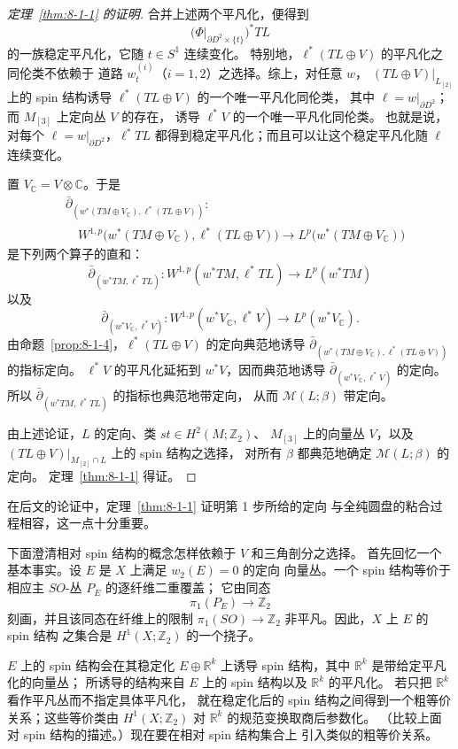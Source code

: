 \begin{proof}[定理~\ref{thm:8-1-1} 的证明]
合并上述两个平凡化，便得到
\[
\bigl(\Phi|_{\partial D^2\times\{t\}}\bigr)^*TL
\]
的一族稳定平凡化，它随 $t\in S^1$ 连续变化。
特别地，$\ell^*(TL\oplus V)$ 的平凡化之同伦类不依赖于
道路 $w_t^{(i)}$（$i=1,2$）之选择。综上，对任意 $w$，
$(TL\oplus V)|_{L_{[2]}}$ 上的 spin 结构诱导
$\ell^*(TL\oplus V)$ 的一个唯一平凡化同伦类，
其中 $\ell=w|_{\partial D^2}$；而 $M_{[3]}$ 上定向丛 $V$ 的存在，
诱导 $\ell^*V$ 的一个唯一平凡化同伦类。
也就是说，对每个 $\ell=w|_{\partial D^2}$，$\ell^*TL$
都得到稳定平凡化；而且可以让这个稳定平凡化随 $\ell$ 连续变化。

置 $V_{\mathbb C}=V\otimes\mathbb C$。于是
\[
\begin{aligned}
&\bar\partial_{(w^*(TM\oplus V_{\mathbb C}),
 \ell^*(TL\oplus V))}\colon\\[-0.2em]
&\quad
W^{1,p}\bigl(w^*(TM\oplus V_{\mathbb C}),
 \ell^*(TL\oplus V)\bigr)
\longrightarrow
L^p\bigl(w^*(TM\oplus V_{\mathbb C})\bigr)
\end{aligned}
\]
是下列两个算子的直和：
\[
\bar\partial_{(w^*TM,\ell^*TL)}\colon
W^{1,p}(w^*TM,\ell^*TL)\longrightarrow L^p(w^*TM)
\]
以及
\[
\bar\partial_{(w^*V_{\mathbb C},\ell^*V)}\colon
W^{1,p}(w^*V_{\mathbb C},\ell^*V)
\longrightarrow L^p(w^*V_{\mathbb C}).
\]
由命题~\ref{prop:8-1-4}，$\ell^*(TL\oplus V)$ 的定向典范地诱导
$\bar\partial_{(w^*(TM\oplus V_{\mathbb C}),
\ell^*(TL\oplus V))}$ 的指标定向。
$\ell^*V$ 的平凡化延拓到 $w^*V$，因而典范地诱导
$\bar\partial_{(w^*V_{\mathbb C},\ell^*V)}$ 的定向。
所以 $\bar\partial_{(w^*TM,\ell^*TL)}$ 的指标也典范地带定向，
从而 $\mathcal M(L;\beta)$ 带定向。

由上述论证，$L$ 的定向、类 $st\in H^2(M;\mathbb Z_2)$、
$M_{[3]}$ 上的向量丛 $V$，以及
$(TL\oplus V)|_{M_{[2]}\cap L}$ 上的 spin 结构之选择，
对所有 $\beta$ 都典范地确定 $\mathcal M(L;\beta)$ 的定向。
定理~\ref{thm:8-1-1} 得证。
\end{proof}

在后文的论证中，定理~\ref{thm:8-1-1} 证明第 1 步所给的定向
与全纯圆盘的粘合过程相容，这一点十分重要。

下面澄清相对 spin 结构的概念怎样依赖于 $V$ 和三角剖分之选择。
首先回忆一个基本事实。设 $E$ 是 $X$ 上满足 $w_2(E)=0$ 的定向
向量丛。一个 spin 结构等价于相应主 $SO$-丛 $P_E$ 的逐纤维二重覆盖；
它由同态
\[
\pi_1(P_E)\longrightarrow\mathbb Z_2
\]
刻画，并且该同态在纤维上的限制
$\pi_1(SO)\to\mathbb Z_2$ 非平凡。因此，$X$ 上 $E$ 的 spin 结构
之集合是 $H^1(X;\mathbb Z_2)$ 的一个挠子。

$E$ 上的 spin 结构会在其稳定化 $E\oplus\mathbb R^k$ 上诱导
spin 结构，其中 $\mathbb R^k$ 是带给定平凡化的向量丛；
所诱导的结构来自 $E$ 上的 spin 结构以及 $\mathbb R^k$ 的平凡化。
若只把 $\mathbb R^k$ 看作平凡丛而不指定具体平凡化，
就在稳定化后的 spin 结构之间得到一个粗等价关系；这些等价类由
$H^1(X;\mathbb Z_2)$ 对 $\mathbb R^k$ 的规范变换取商后参数化。
（比较上面对 spin 结构的描述。）现在要在相对 spin 结构集合上
引入类似的粗等价关系。

